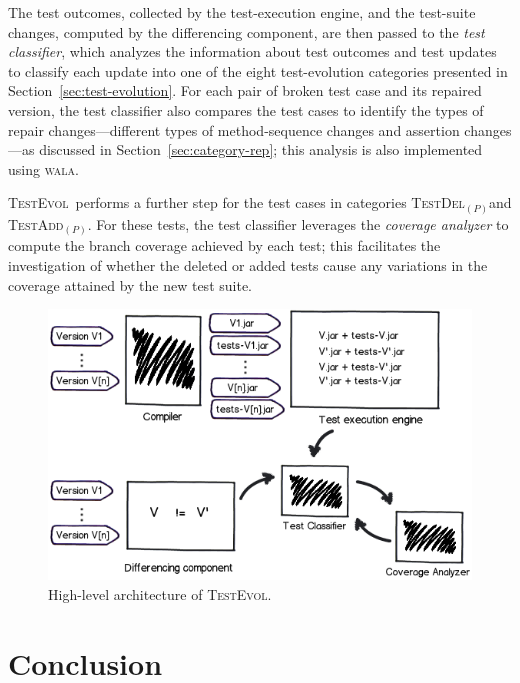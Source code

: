 \documentclass[conference]{IEEEtran}
\newcommand{\mt}{\mathit}
\newcommand{\catdelp}{\textsc{TestDel}$_\mt{(P)}$}
\newcommand{\cataddp}{\textsc{TestAdd}$_\mt{(P)}$}
\newcommand{\tool}{\textsc{TestEvol}\xspace}
\begin{document}
The test outcomes, collected by the test-execution engine, and the
test-suite changes, computed by the differencing component, are then
passed to the \emph{test classifier}, which analyzes the information
about test outcomes and test updates to classify each update into one
of the eight test-evolution categories presented in
Section~\ref{sec:test-evolution}.  For each pair of broken test case
and its repaired version, the test classifier also compares the test
cases to identify the types of repair changes---different types of
method-sequence changes and assertion changes---as discussed in
Section~\ref{sec:category-rep}; this analysis is also implemented
using \textsc{wala}.

\tool\ performs a further step for the test cases in categories
\catdelp{}and \cataddp{}. For these tests, the test classifier
leverages the \emph{coverage analyzer} to compute the branch coverage
achieved by each test; this facilitates the investigation of whether
the deleted or added tests cause any variations in the coverage
attained by the new test suite.

\begin{figure}
	\centering
	\includegraphics[width=\columnwidth]{architecture}
        \vspace*{-16pt}
	\caption{High-level architecture of \tool.}
        \vspace*{-8pt}
	\label{fig:trex}
\end{figure}

\vspace*{-8pt}
\section{Conclusion}
\label{sec:summary}
\end{document}
